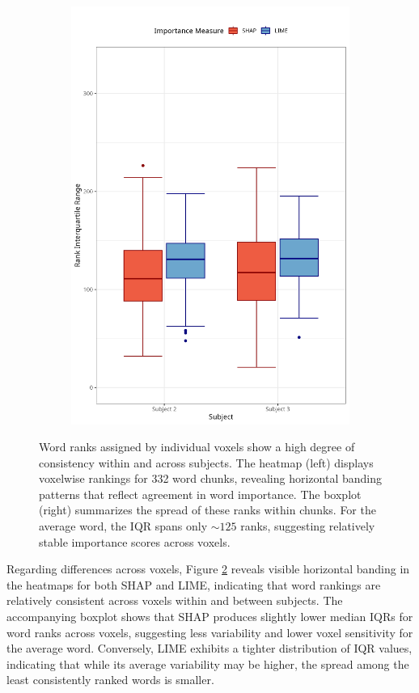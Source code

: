 \documentclass[10pt,letterpaper]{article}
\begin{document}
\begin{figure}[ht]
\begin{subfigure}[t]{0.35\textwidth}
        \includegraphics[width=\textwidth]{figs/boxplot_buck.png}
        \label{subfig:boxplot_buck}
    \end{subfigure}
    \caption{Word ranks assigned by individual voxels show a high degree of consistency within and across subjects. The heatmap (left) displays voxelwise rankings for 332 word chunks, revealing horizontal banding patterns that reflect agreement in word importance. The boxplot (right) summarizes the spread of these ranks within chunks. For the average word, the IQR spans only ${\sim}125$ ranks, suggesting relatively stable importance scores across voxels.}
    \label{fig:buck_voxelwise}
\end{figure}

\newpage

Regarding differences across voxels, Figure \ref{fig:buck_voxelwise} reveals visible horizontal banding in the heatmaps for both SHAP and LIME, indicating that word rankings are relatively consistent across voxels within and between subjects. The accompanying boxplot shows that SHAP produces slightly lower median IQRs for word ranks across voxels, suggesting less variability and lower voxel sensitivity for the average word. Conversely, LIME exhibits a tighter distribution of IQR values, indicating that while its average variability may be higher, the spread among the least consistently ranked words is smaller.
\end{document}

